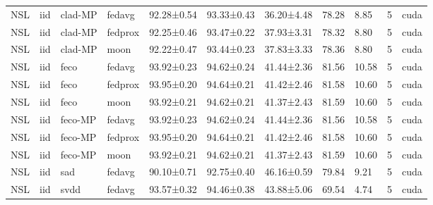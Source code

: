 \begin{tabular}{lllllllllrl}
NSL & iid & clad-MP & fedavg & 92.28±0.54 & 93.33±0.43 & 36.20±4.48 & 78.28 & 8.85 & 5 & cuda \\
NSL & iid & clad-MP & fedprox & 92.25±0.46 & 93.47±0.22 & 37.93±3.31 & 78.32 & 8.80 & 5 & cuda \\
NSL & iid & clad-MP & moon & 92.22±0.47 & 93.44±0.23 & 37.83±3.33 & 78.36 & 8.80 & 5 & cuda \\
NSL & iid & feco & fedavg & 93.92±0.23 & 94.62±0.24 & 41.44±2.36 & 81.56 & 10.58 & 5 & cuda \\
NSL & iid & feco & fedprox & 93.95±0.20 & 94.64±0.21 & 41.42±2.46 & 81.58 & 10.60 & 5 & cuda \\
NSL & iid & feco & moon & 93.92±0.21 & 94.62±0.21 & 41.37±2.43 & 81.59 & 10.60 & 5 & cuda \\
NSL & iid & feco-MP & fedavg & 93.92±0.23 & 94.62±0.24 & 41.44±2.36 & 81.56 & 10.58 & 5 & cuda \\
NSL & iid & feco-MP & fedprox & 93.95±0.20 & 94.64±0.21 & 41.42±2.46 & 81.58 & 10.60 & 5 & cuda \\
NSL & iid & feco-MP & moon & 93.92±0.21 & 94.62±0.21 & 41.37±2.43 & 81.59 & 10.60 & 5 & cuda \\
NSL & iid & sad & fedavg & 90.10±0.71 & 92.75±0.40 & 46.16±0.59 & 79.84 & 9.21 & 5 & cuda \\
NSL & iid & svdd & fedavg & 93.57±0.32 & 94.46±0.38 & 43.88±5.06 & 69.54 & 4.74 & 5 & cuda \\
\bottomrule
\end{tabular}
